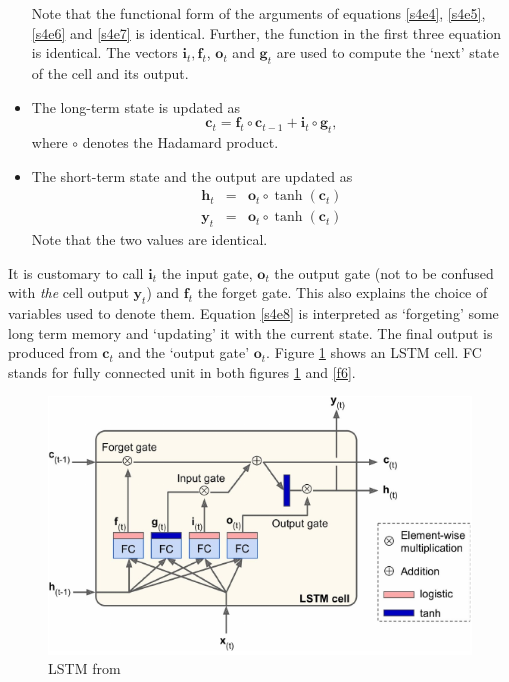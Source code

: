 \documentclass[11pt]{article}
\numberwithin{equation}{section}
\renewcommand{\vec}{\mathbf}
\begin{document}
\begin{itemize}
Note that the functional form of the arguments of equations \eqref{s4e4}, 
\eqref{s4e5}, \eqref{s4e6} and \eqref{s4e7} is identical. Further, the function
in the first three equation is identical. The vectors $\vec{i}_t, \vec{f}_t$, 
$\vec{o}_t$ and $\vec{g}_t$ are used to compute the `next' state of the cell 
and its output.
\item The long-term state is updated as
\begin{equation}\label{s4e8}
\vec{c}_t = \vec{f}_t \circ \vec{c}_{t-1} + \vec{i}_t \circ \vec{g}_t,
\end{equation}
where $\circ$ denotes the Hadamard product. 
\item The short-term state and the output are updated as
\begin{eqnarray}
\vec{h}_t &=& \vec{o}_t \circ \tanh(\vec{c}_t) \label{s4e9} \\
\vec{y}_t &=& \vec{o}_t \circ \tanh(\vec{c}_t) \label{s4e10} 
\end{eqnarray}
Note that the two values are identical.
\end{itemize}
It is customary to call $\vec{i}_t$ the input gate, $\vec{o}_t$ the output gate
(not to be confused with \emph{the} cell output $\vec{y}_t$) and $\vec{f}_t$
the forget gate. This also explains the choice of variables used to denote them.
Equation \eqref{s4e8} is interpreted as `forgeting' some long term memory
and `updating' it with the current state. The final output is produced from
$\vec{c}_t$ and the `output gate' $\vec{o}_t$. Figure \ref{f5} shows an
LSTM cell. FC stands for fully connected unit in both figures \ref{f5} and 
\ref{f6}.
\begin{figure}
\centering
\includegraphics[scale=0.5]{lstm}
\caption{LSTM from \cite{geron2019hands}}\label{f5}
\end{figure}
\end{document}
